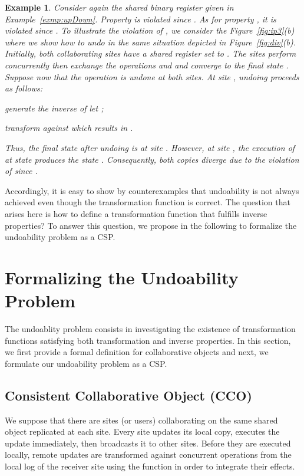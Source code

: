 \documentclass[submission,copyright,creativecommons]{eptcs}
\newtheorem{example}{Example}
\begin{document}
\begin{example}\label{exmp:e14}
Consider again the shared binary register given in Example~\ref{exmp:upDown}.
Property  is violated since . As for  property , it is violated since . 
To illustrate the violation of , we consider  the Figure~\ref{fig:ip3}(b) where we show how to undo  in the same situation depicted in Figure~\ref{fig:div}(b). Initially, both collaborating sites have a shared register set to   . The sites perform concurrently then exchange the   operations  and  and converge to the final state . Suppose now that the operation  is undone at both sites.
At site , undoing  proceeds as follows:
\begin{inparaenum}[(i)]
\item  generate the  inverse of  let ;
\item transform  against  which results in .
\end{inparaenum}  Thus, the final state after undoing  is  at site . However, at site , the execution of  at state  produces the state .
Consequently, both copies diverge due to the violation of   since .
\end{example} 

Accordingly, it is easy to show by counterexamples that undoability is not always achieved even though the transformation function is correct. The question that arises here is how to define a transformation function that fulfills inverse properties? To answer this question, we propose in the following  to formalize the undoability problem as a CSP.

\section{Formalizing the Undoability Problem}\label{sec:formalProbStatement}
The undoablity problem  consists in investigating the existence of transformation functions satisfying both transformation and inverse
properties. In this section, we first provide a formal definition for collaborative objects and next, we formulate our undoability problem as a CSP.

\subsection{Consistent Collaborative Object (CCO)}
 
We suppose that there are  sites (or users) collaborating on the same shared object replicated at each site.
Every site updates its local copy, executes the update immediately, then broadcasts it to other sites.
Before they are executed locally, remote updates are transformed against concurrent operations from the local log of the receiver site using the  function in order to integrate their effects. 
\end{document}
